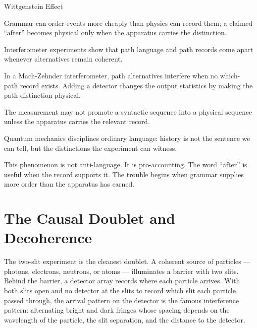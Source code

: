 \begin{phenom}{Wittgenstein Effect}
\label{ph:wittgenstein-effect}

\PhStatement Grammar can order events more cheaply than physics can record
them; a claimed ``after'' becomes physical only when the apparatus carries the
distinction.

\PhOrigin Interferometer experiments show that path language and path records
come apart whenever alternatives remain coherent.

\PhObservation In a Mach-Zehnder interferometer, path alternatives interfere
when no which-path record exists. Adding a detector changes the output
statistics by making the path distinction physical.

\PhConstraint The measurement may not promote a syntactic sequence into a
physical sequence unless the apparatus carries the relevant record.

\PhConsequence Quantum mechanics disciplines ordinary language: history is not
the sentence we can tell, but the distinctions the experiment can witness.

\end{phenom}

This phenomenon is not anti-language. It is pro-accounting. The word ``after''
is useful when the record supports it. The trouble begins when grammar supplies
more order than the apparatus has earned.


\section{The Causal Doublet and Decoherence}
\label{se:the-causal-doublet-and-decoherence}

The two-slit experiment is the cleanest doublet. A coherent source of
particles --- photons, electrons, neutrons, or atoms --- illuminates a barrier
with two slits. Behind the barrier, a detector array records where each
particle arrives. With both slits open and no detector at the slits to
record which slit each particle passed through, the arrival pattern on the
detector is the famous interference pattern: alternating bright and dark
fringes whose spacing depends on the wavelength of the particle, the slit
separation, and the distance to the detector.

